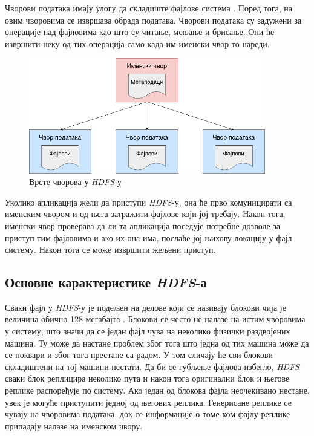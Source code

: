 \documentclass[12pt,oneside]{memoir}
\begin{document}
Чворови података имају улогу да складиште фајлове система \cite{hadoop_arch_guide}. Поред тога, на овим чворовима се извршава обрада података. Чворови података су задужени за операције над фајловима као што су читање, мењање и брисање. Они ће извршити неку од тих операција само када им именски чвор то нареди.

\begin{figure}[!ht]
  \centering
  \includegraphics[width=0.92\textwidth]{pictures/node_types.png}
  \caption{Врсте чворова у \textit{HDFS}-у}
  \label{fig:hadoop_nodovi}
\end{figure}

Уколико апликација жели да приступи \textit{HDFS}-у, она ће прво комуницирати са именским чвором и од њега затражити фајлове који јој требају. Након тога, именски чвор проверава да ли та апликација поседује потребне дозволе за приступ тим фајловима и ако их она има, послаће јој њихову локацију у фајл систему. Након тога се може извршити жељени приступ. 

\subsection{Основне карактеристике \textit{HDFS}-а}
\label{subsec:hdfs_osobine}

Сваки фајл у \textit{HDFS}-у је подељен на делове који се називају блокови чија је величина обично 128 мегабајта \cite{hadoop_arch_guide}. Блокови се често не налазе на истим чворовима у систему, што значи да се један фајл чува на неколико физички раздвојених машина. Ту може да настане проблем због тога што једна од тих машина може да се поквари и због тога престане са радом. У том сличају ће сви блокови складиштени на тој машини нестати. Да би се губљење фајлова избегло, \textit{HDFS} сваки блок реплицира неколико пута и након тога оригинални блок и његове реплике распоређује по систему. Ако један од блокова фајла неочекивано нестане, увек је могуће приступити једној од његових реплика. Генерисане реплике се чувају на чворовима података, док се информације о томе ком фајлу реплике припадају налазе на именском чвору.
\end{document}
